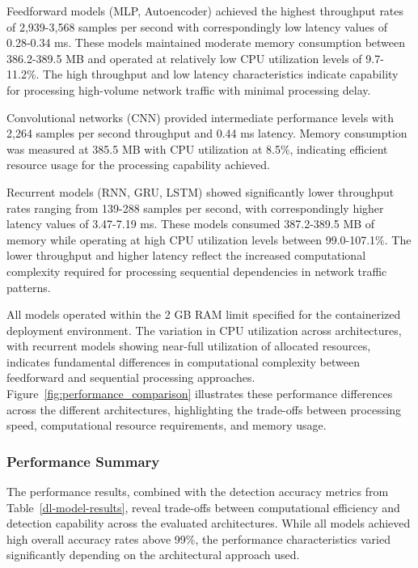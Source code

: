 \documentclass[journal,article,submit,moreauthors,pdftex]{Definitions/tsp}
\begin{document}
Feedforward models (MLP, Autoencoder) achieved the highest throughput rates of 2,939-3,568 samples per second with correspondingly low latency values of 0.28-0.34 ms. These models maintained moderate memory consumption between 386.2-389.5 MB and operated at relatively low CPU utilization levels of 9.7-11.2\%. The high throughput and low latency characteristics indicate capability for processing high-volume network traffic with minimal processing delay.

Convolutional networks (CNN) provided intermediate performance levels with 2,264 samples per second throughput and 0.44 ms latency. Memory consumption was measured at 385.5 MB with CPU utilization at 8.5\%, indicating efficient resource usage for the processing capability achieved.

Recurrent models (RNN, GRU, LSTM) showed significantly lower throughput rates ranging from 139-288 samples per second, with correspondingly higher latency values of 3.47-7.19 ms. These models consumed 387.2-389.5 MB of memory while operating at high CPU utilization levels between 99.0-107.1\%. The lower throughput and higher latency reflect the increased computational complexity required for processing sequential dependencies in network traffic patterns.

All models operated within the 2 GB RAM limit specified for the containerized deployment environment. The variation in CPU utilization across architectures, with recurrent models showing near-full utilization of allocated resources, indicates fundamental differences in computational complexity between feedforward and sequential processing approaches. Figure~\ref{fig:performance_comparison} illustrates these performance differences across the different architectures, highlighting the trade-offs between processing speed, computational resource requirements, and memory usage.

\subsubsection{Performance Summary}

The performance results, combined with the detection accuracy metrics from Table~\ref{dl-model-results}, reveal trade-offs between computational efficiency and detection capability across the evaluated architectures. While all models achieved high overall accuracy rates above 99\%, the performance characteristics varied significantly depending on the architectural approach used.
\end{document}
